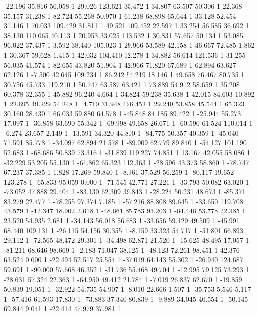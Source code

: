 	-22.196 35.816 56.058 1
	29.026 123.621 35.472 1
	34.807 63.507 50.306 1
	22.368 35.157 31.238 1
	82.724 55.268 50.970 1
	61.238 68.898 65.644 1
	33.128 52.454 31.146 1
	70.033 109.429 31.811 1
	49.521 109.452 22.597 1
	33.254 56.585 36.692 1
	38.130 110.065 40.113 1
	20.953 33.025 113.532 1
	30.831 57.657 50.134 1
	53.085 96.022 37.437 1
	3.592 38.440 105.023 1
	29.966 53.589 42.158 1
	46.667 72.485 1.862 1
	30.367 59.628 1.415 1
	42.032 104.410 12.278 1
	34.882 56.614 121.536 1
	31.255 56.035 41.574 1
	82.655 43.820 51.904 1
	42.966 71.820 67.689 1
	62.894 63.627 62.126 1
	-7.500 42.645 109.234 1
	86.242 54.219 18.146 1
	49.658 76.467 80.735 1
	30.756 45.733 119.210 1
	50.747 63.587 63.421 1
	73.889 54.912 58.659 1
	35.208 60.378 32.355 1
	45.882 96.240 4.664 1
	34.824 59.238 35.638 1
	42.015 84.603 10.892 1
	22.695 49.229 54.248 1
	-4.710 31.948 126.452 1
	29.249 53.858 45.544 1
	65.323 30.160 28.430 1
	66.033 59.880 64.578 1
	-45.848 84.185 89.422 1
	-25.944 55.273 17.097 1
	-36.858 63.690 55.342 1
	-69.998 49.658 26.671 1
	-60.590 61.524 110.014 1
	-6.274 23.657 2.149 1
	-13.591 34.320 44.800 1
	-84.775 50.357 40.359 1
	-45.040 71.591 85.778 1
	-34.097 62.894 21.578 1
	-89.909 62.779 89.840 1
	-54.127 101.190 52.683 1
	-68.686 50.839 73.316 1
	-31.839 119.227 74.851 1
	13.167 42.055 58.086 1
	-32.229 53.205 55.130 1
	-61.862 65.323 112.363 1
	-28.596 43.373 58.860 1
	-78.747 67.237 37.385 1
	1.828 17.269 59.840 1
	-8.961 37.529 56.259 1
	-80.117 19.652 123.278 1
	-65.833 95.059 0.000 1
	-71.545 42.771 27.221 1
	-33.793 50.082 63.020 1
	-73.052 47.888 29.404 1
	-83.130 62.309 39.843 1
	-28.224 50.231 48.673 1
	-85.371 83.279 22.477 1
	-78.255 97.374 7.185 1
	-57.216 88.808 89.645 1
	-33.650 119.708 43.579 1
	-12.347 18.902 2.618 1
	-48.661 85.783 93.203 1
	-64.446 53.778 22.385 1
	23.520 54.935 2.681 1
	-34.143 56.018 56.683 1
	-33.656 59.129 49.509 1
	-45.991 68.440 109.131 1
	-26.115 54.156 30.355 1
	-8.159 33.323 54.717 1
	-51.801 66.893 29.112 1
	-72.565 48.472 29.301 1
	-34.498 62.871 21.520 1
	-15.625 48.495 17.057 1
	-81.211 68.646 98.669 1
	-2.183 71.047 38.125 1
	-48.123 72.261 98.451 1
	42.376 63.524 0.000 1
	-22.494 52.517 25.554 1
	-37.019 64.143 55.302 1
	-26.940 124.687 59.691 1
	-90.000 57.668 46.352 1
	-31.736 55.468 49.704 1
	-12.995 79.125 73.293 1
	-28.631 57.324 22.363 1
	-64.950 49.412 21.784 1
	-7.019 26.837 62.670 1
	-19.859 50.839 19.051 1
	-32.922 54.735 54.907 1
	-8.010 22.666 1.507 1
	-35.753 5.546 5.117 1
	-57.416 61.593 17.830 1
	-73.883 37.340 80.839 1
	-9.889 34.045 40.554 1
	-50.145 69.844 9.041 1
	-22.414 47.979 37.981 1
